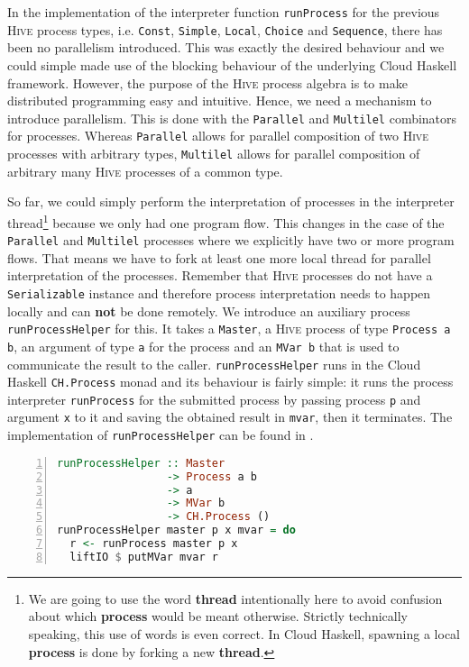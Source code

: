 In the implementation of the interpreter function \texttt{runProcess} for the previous \textsc{Hive} process types, i.e. \texttt{Const}, \texttt{Simple}, \texttt{Local}, \texttt{Choice} and \texttt{Sequence}, there has been no parallelism introduced. This was exactly the desired behaviour and we could simple made use of the blocking behaviour of the underlying \textsf{Cloud Haskell} framework. However, the purpose of the \textsc{Hive} process algebra is to make distributed programming easy and intuitive. Hence, we need a mechanism to introduce parallelism. This is done with the \texttt{Parallel} and \texttt{Multilel} combinators for processes. Whereas \texttt{Parallel} allows for parallel composition of two \textsc{Hive} processes with arbitrary types, \texttt{Multilel} allows for parallel composition of arbitrary many \textsc{Hive} processes of a common type.

So far, we could simply perform the interpretation of processes in the interpreter thread\footnote{We are going to use the word \textbf{thread} intentionally here to avoid confusion about which \textbf{process} would be meant otherwise. Strictly technically speaking, this use of words is even correct. In \textsf{Cloud Haskell}, spawning a local \textbf{process} is done by forking a new \textbf{thread}.} because we only had one program flow. This changes in the case of the \texttt{Parallel} and \texttt{Multilel} processes where we explicitly have two or more program flows. That means we have to fork at least one more local thread for parallel interpretation of the processes. Remember that \textsc{Hive} processes do not have a \texttt{Serializable} instance and therefore process interpretation needs to happen locally and can \textbf{not} be done remotely. We introduce an auxiliary process \texttt{runProcessHelper} for this. It takes a \texttt{Master}, a \textsc{Hive} process of type \texttt{Process a b}, an argument of type \texttt{a} for the process and an \texttt{MVar b} that is used to communicate the result to the caller. \texttt{runProcessHelper} runs in the \textsf{Cloud Haskell} \texttt{CH.Process} monad and its behaviour is fairly simple: it runs the process interpreter \texttt{runProcess} for the submitted process by passing process \texttt{p} and argument \texttt{x} to it and saving the obtained result in \texttt{mvar}, then it terminates. The implementation of \texttt{runProcessHelper} can be found in .
\begin{lstlisting}[language=Haskell,caption=Auxiliary process for the interpretation of \texttt{Parallel} and \texttt{Multilel} processes.,label=lst:runprocesshelper,numbers=left,frame=bt]
runProcessHelper :: Master
                 -> Process a b
                 -> a
                 -> MVar b
                 -> CH.Process ()
runProcessHelper master p x mvar = do
  r <- runProcess master p x
  liftIO $ putMVar mvar r
\end{lstlisting}

